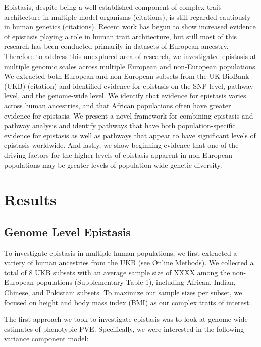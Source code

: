 \documentclass[12pt, a4paper]{article}
\begin{document}
Epistasis, despite being a well-established component of complex trait architecture in multiple model organisms (citations), is still regarded cautiously in human genetics (citations). Recent work has begun to show increased evidence of epistasis playing a role in human trait architecture, but still most of this research has been conducted primarily in datasets of European ancestry. Therefore to address this unexplored area of research, we investigated epistasis at multiple genomic scales across multiple European and non-European populations. We extracted both European and non-European subsets from the UK BioBank (UKB) (citation) and identified evidence for epistasis on the SNP-level, pathway-level, and the genome-wide level. We identify that evidence for epistasis varies across human ancestries, and that African populations often have greater evidence for epistasis. We present a novel framework for combining epistasis and pathway analysis and identify pathways that have both population-specific evidence for epistasis as well as pathways that appear to have significant levels of epistasis worldwide. And lastly, we show beginning evidence that one of the driving factors for the higher levels of epistasis apparent in non-European populations may be greater levels of population-wide genetic diversity.


\section{Results}\label{InterPath-Results}

\subsection{Genome Level Epistasis}\label{InterPath-Results-GenomeEpistasis}

To investigate epistasis in multiple human populations, we first extracted a variety of human ancestries from the UKB (see Online Methods). We collected a total of 8 UKB subsets with an average sample size of XXXX among the non-European populations (Supplementary Table 1), including African, Indian, Chinese, and Pakistani subsets. To maximize our sample sizes per subset, we focused on height and body mass index (BMI) as our complex traits of interest. 

The first approach we took to investigate epistasis was to look at genome-wide estimates of phenotypic PVE. Specifically, we were interested in the following variance component model:
\end{document}
